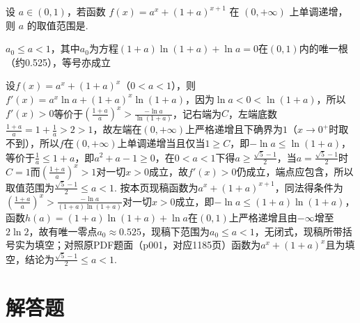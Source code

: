 \begin{problem}
设 \(a\in(0,1)\)，若函数
\(f(x)=a^x+(1+a)^{x+1}\)
在 \((0,+\infty)\) 上单调递增，则 \(a\) 的取值范围是\fillinblank{}.
\end{problem}

\begin{answer}
\(a_{0}\le a<1\)，其中\(a_{0}\)为方程\(\left(1+a\right)\ln\left(1+a\right)+\ln a=0\)在\(\left(0,1\right)\)内的唯一根（约0.525），等号亦成立
\end{answer}

\begin{solution}
设\(f\left(x\right)=a^{x}+\left(1+a\right)^{x}\)（\(0<a<1\)），则\(f'\left(x\right)=a^{x}\ln a+\left(1+a\right)^{x}\ln\left(1+a\right)\)，因为\(\ln a<0<\ln\left(1+a\right)\)，所以\(f'\left(x\right)>0\)等价于\(\left(\frac{1+a}{a}\right)^{x}>\frac{-\ln a}{\ln\left(1+a\right)}\)，记右端为\(C\)，左端底数\(\frac{1+a}{a}=1+\frac{1}{a}>2>1\)，故左端在\(\left(0,+\infty\right)\)上严格递增且下确界为\(1\)（\(x\to0^{+}\)时取不到），所以\(f\)在\(\left(0,+\infty\right)\)上单调递增当且仅当\(1\ge C\)，即\(-\ln a\le\ln\left(1+a\right)\)，等价于\(\frac{1}{a}\le1+a\)，即\(a^{2}+a-1\ge0\)，在\(0<a<1\)下得\(a\ge\frac{\sqrt{5}-1}{2}\)，当\(a=\frac{\sqrt{5}-1}{2}\)时\(C=1\)而\(\left(\frac{1+a}{a}\right)^{x}>1\)对一切\(x>0\)成立，故\(f'\left(x\right)>0\)仍成立，端点应包含，所以取值范围为\(\frac{\sqrt{5}-1}{2}\le a<1\). 按本页现稿函数为\(a^{x}+\left(1+a\right)^{x+1}\)，同法得条件为\(\left(\frac{1+a}{a}\right)^{x}>\frac{-\ln a}{\left(1+a\right)\ln\left(1+a\right)}\)对一切\(x>0\)成立，即\(-\ln a\le\left(1+a\right)\ln\left(1+a\right)\)，函数\(h\left(a\right)=\left(1+a\right)\ln\left(1+a\right)+\ln a\)在\(\left(0,1\right)\)上严格递增且由\(-\infty\)增至\(2\ln2\)，故有唯一零点\(a_{0}\approx0.525\)，现稿下范围为\(a_{0}\le a<1\)，无闭式，现稿所带括号实为填空；对照原PDF题面（p001，对应1185页）函数为\(a^{x}+\left(1+a\right)^{x}\)且为填空，结论为\(\frac{\sqrt{5}-1}{2}\le a<1\).
\end{solution}
\section{解答题}


